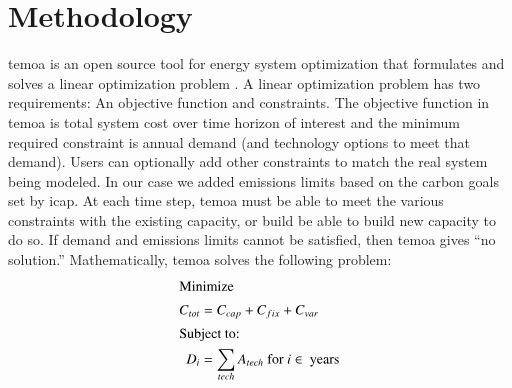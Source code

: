\section{Methodology}
\gls{temoa} is an open source tool for energy system optimization that
formulates and solves a linear optimization problem
\cite{decarolis_tools_2020}. A linear optimization
problem has two requirements: An objective function and constraints. The
objective function in \gls{temoa} is total system cost over time horizon
of interest and the minimum required constraint is annual demand (and
technology options to meet that demand). Users can optionally add other
constraints to match the real system being modeled. In our case we added
emissions limits based on the carbon goals set by \gls{icap}. At each time step,
\gls{temoa} must be able to meet the various constraints with the existing
capacity, or build be able to build new capacity to do so. If demand and
emissions limits cannot be satisfied, then \gls{temoa} gives ``no solution.''
Mathematically, \gls{temoa} solves the following problem:
\begin{align}
  \intertext{Minimize}
  C_{tot} &= C_{cap} + C_{fix} + C_{var}\\
  \intertext{Subject to:}
  D_i &= \sum_{tech}A_{tech} \mbox{ for } i \in \mbox{ years}
\end{align}
